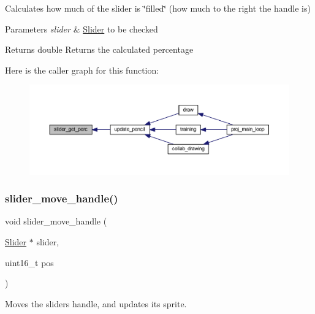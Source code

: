 Calculates how much of the slider is \char`\"{}filled\char`\"{} (how much to the right the handle is) 


\begin{DoxyParams}{Parameters}
{\em slider} & \mbox{\hyperlink{struct_slider}{Slider}} to be checked \\
\hline
\end{DoxyParams}
\begin{DoxyReturn}{Returns}
double Returns the calculated percentage 
\end{DoxyReturn}
Here is the caller graph for this function\+:\nopagebreak
\begin{figure}[H]
\begin{center}
\leavevmode
\includegraphics[width=350pt]{group__sprite_ga3ac8528c0dc7f14cd06be7fd636fd6d7_icgraph}
\end{center}
\end{figure}
\mbox{\label{group__sprite_ga3f6696185609cd55e3535258deb30ea7}} 
\subsubsection{\texorpdfstring{slider\+\_\+move\+\_\+handle()}{slider\_move\_handle()}}
{\footnotesize\ttfamily void slider\+\_\+move\+\_\+handle (\begin{DoxyParamCaption}\item[{\mbox{\hyperlink{struct_slider}{Slider}} $\ast$}]{slider,  }\item[{uint16\+\_\+t}]{pos }\end{DoxyParamCaption})}



Moves the sliders handle, and updates its sprite. 


